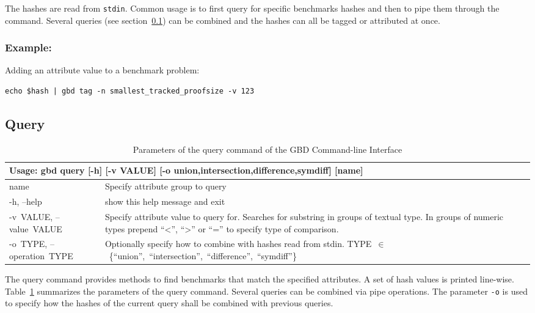 \documentclass{easychair}
\begin{document}
The hashes are read from \texttt{stdin}. 
Common usage is to first query for specific benchmarks hashes and then to pipe them through the command.
Several queries (see section~\ref{cli:query}) can be combined and the hashes can all be tagged or attributed at once.

\subsubsection{Example:} Adding an attribute value to a benchmark problem:
\begin{verbatim}
echo $hash | gbd tag -n smallest_tracked_proofsize -v 123 
\end{verbatim}


\subsection{Query}
\label{cli:query}

\begin{table}[ht]
\begin{tabular}{p{.23\linewidth}|p{.73\linewidth}}
\multicolumn{2}{l}{\bf Usage: \textsf{gbd query [-h] [-v VALUE]
                    [-o {union,intersection,difference,symdiff}]
                    [name]}}\\

\hline
  \sf name                  &Specify attribute group to query\\

  \sf -h, --help            &show this help message and exit\\
  \sf \mbox{-v VALUE}, \mbox{--value VALUE}
                        &Specify attribute value to query for. Searches for
                        substring in groups of textual type. In groups of
                        numeric types prepend \textsf{``<'', ``>'' or ``=''} to specify type
                        of comparison.\\
  \sf \mbox{-o TYPE}, \mbox{--operation TYPE}
  			            &Optionally specify how to combine with hashes read
                        from \textsf{stdin}. \mbox{\textsf{TYPE $\in$ \{``union'', ``intersection'', ``difference'', ``symdiff''\}}}
\end{tabular}
\caption{Parameters of the query command of the GBD Command-line Interface}
\label{fig:cli:query}
\end{table}

The query command provides methods to find benchmarks that match the specified attributes. 
A set of hash values is printed line-wise. 
Table~\ref{fig:cli:query} summarizes the parameters of the query command.
Several queries can be combined via pipe operations. 
The parameter \texttt{-o} is used to specify how the hashes of the current query shall be
combined with previous queries. 
\end{document}
